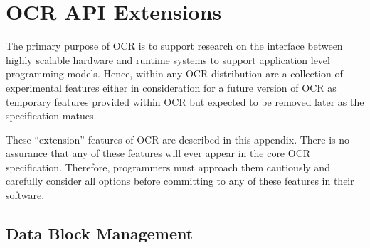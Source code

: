 %

\chapter{OCR API Extensions}
\label{chap:OCR API Extensions}
\label{chap:Appendix B}

The primary purpose of OCR is to support research on the interface between 
highly scalable hardware and runtime systems to support application level programming 
models.   Hence, within any OCR distribution are a collection of experimental features
either in consideration for a future version of OCR as  temporary features
provided within OCR but expected to be removed later as the specification matues.

These ``extension'' features of OCR are described in this appendix.  There is no
assurance that any of these features will ever appear in the core OCR specification.
Therefore, programmers must approach them cautiously and carefully consider 
all options before committing to any of these features in their software.

\section{Data Block Management}


